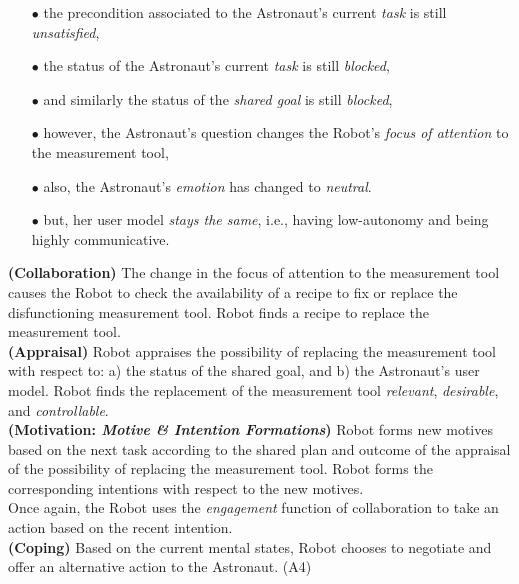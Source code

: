 \begin{itemize}
  \item[$\bullet$] the precondition associated to the Astronaut's current
  \textit{task} is still \textit{unsatisfied},
  \item[$\bullet$] the status of the Astronaut's current \textit{task} is still
  \textit{blocked},
  \item[$\bullet$] and similarly the status of the \textit{shared goal} is
  still \textit{blocked},
  \item[$\bullet$] however, the Astronaut's question changes the Robot's
  \textit{focus of attention} to the measurement tool,
  \item[$\bullet$] also, the Astronaut's \textit{emotion} has changed to
  \textit{neutral}.
  \item[$\bullet$] but, her user model \textit{stays the same}, i.e.,
  having low-autonomy and being highly communicative.
\end{itemize}

\noindent\textbf{(Collaboration)} The change in the focus of attention to the
measurement tool causes the Robot to check the availability of a recipe to fix
or replace the disfunctioning measurement tool. Robot finds a recipe to replace
the measurement tool.\\

\noindent\textbf{(Appraisal)} Robot appraises the possibility of
replacing the measurement tool with respect to: a) the status of the shared
goal, and b) the Astronaut's user model. Robot finds the replacement of the
measurement tool \textit{relevant}, \textit{desirable}, and
\textit{controllable}.\\

\noindent\textbf{(Motivation: \textit{Motive \& Intention Formations})} Robot
forms new motives based on the next task according to the shared plan and
outcome of the appraisal of the possibility of replacing the measurement tool.
Robot forms the corresponding intentions with respect to the new motives.\\

Once again, the Robot uses the \textit{engagement} function of collaboration to
take an action based on the recent intention.\\

\noindent\textbf{(Coping)} Based on the current mental states, Robot
chooses to negotiate and offer an alternative action to the Astronaut. (A4)\\

